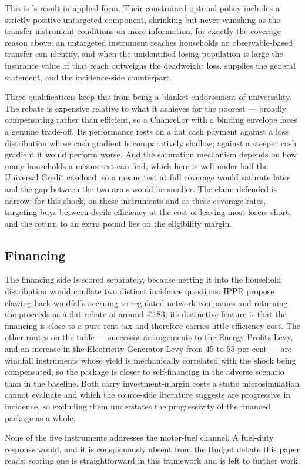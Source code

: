 This is \citet{levell2025}'s result in applied form. Their constrained-optimal policy includes a strictly positive untargeted component, shrinking but never vanishing as the transfer instrument conditions on more information, for exactly the coverage reason above: an untargeted instrument reaches households no observable-based transfer can identify, and when the unidentified losing population is large the insurance value of that reach outweighs the deadweight loss. \citet{sallee2019} supplies the general statement, \citet{cronin2019} and \citet{douenne2020} the incidence-side counterpart.

Three qualifications keep this from being a blanket endorsement of universality. The rebate is expensive relative to what it achieves for the poorest --- broadly compensating rather than efficient, so a Chancellor with a binding envelope faces a genuine trade-off. Its performance rests on a flat cash payment against a loss distribution whose cash gradient is comparatively shallow; against a steeper cash gradient it would perform worse. And the saturation mechanism depends on how many households a means test can find, which here is well under half the Universal Credit caseload, so a means test at full coverage would saturate later and the gap between the two arms would be smaller. The claim defended is narrow: for this shock, on these instruments and at these coverage rates, targeting buys between-decile efficiency at the cost of leaving most losers short, and the return to an extra pound lies on the eligibility margin.

\subsection{Financing}

The financing side is scored separately, because netting it into the household distribution would conflate two distinct incidence questions. IPPR propose clawing back windfalls accruing to regulated network companies and returning the proceeds as a flat rebate of around \pounds 183; its distinctive feature is that the financing is close to a pure rent tax and therefore carries little efficiency cost. The other routes on the table --- successor arrangements to the Energy Profits Levy, and an increase in the Electricity Generator Levy from 45 to 55 per cent --- are windfall instruments whose yield is mechanically correlated with the shock being compensated, so the package is closer to self-financing in the adverse scenario than in the baseline. Both carry investment-margin costs a static microsimulation cannot evaluate and which the source-side literature \citep{goulder2019} suggests are progressive in incidence, so excluding them understates the progressivity of the financed package as a whole.

None of the five instruments addresses the motor-fuel channel. A fuel-duty response would, and it is conspicuously absent from the Budget debate this paper reads; scoring one is straightforward in this framework and is left to further work.

